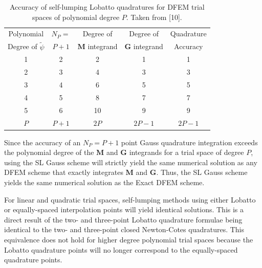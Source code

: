 %
%
\begin{table}[!htp]
\centering
\caption{Accuracy of self-lumping Lobatto quadratures for DFEM trial spaces of polynomial degree $P$.  Taken from [10].}
\begin{tabular}{|c|c|c|c|c|} 
\hline
  Polynomial 											& $N_P=$		  & Degree of   					 &  Degree of   					&  Quadrature  \\
  Degree  of $\widetilde{\psi}$		& $P+1$		 		& $\mathbf{M}$ integrand & $\mathbf{G}$ integrand &  Accuracy  \\
	\hline
				1   											&   2   		&   2   								&		1									        &				1				  \\ 		\hline
				2   											&   3   		&    4  								&			3						            &				3		      \\		\hline
				3   											&   4   		&   6   								&			5 					            &				5		      \\		\hline
				4   											&   5   		&   8   								&			7 				              &				7					\\		\hline
				5   											&   6   		&    10  								&			9										    &				9					\\		\hline
				$P$  										 &   $P+1$   &   $2P$   							&	 $2P-1$						          &		$2P - 1$						\\ \hline
\end{tabular}
\label{tbl:int_acc_lobatto} 
\end{table}
%

Since the accuracy of an $N_P=P+1$ point Gauss quadrature integration exceeds the polynomial degree of the $\mathbf{M}$ and $\mathbf{G}$ integrands for a trial space of degree $P$, using the SL Gauss scheme will strictly yield the same numerical solution as any DFEM scheme that exactly integrates $\mathbf{M}$ and $\mathbf{G}$.
Thus, the SL Gauss scheme yields the same numerical solution as the Exact DFEM scheme.
%

For linear and quadratic trial spaces, self-lumping methods using either Lobatto or equally-spaced interpolation points will yield identical solutions.  
This is a direct result of the two- and three-point Lobatto quadrature formulae being identical to the two- and three-point closed Newton-Cotes quadratures.
This equivalence does not hold for higher degree polynomial trial spaces because the Lobatto quadrature points will no longer correspond to the equally-spaced quadrature points.

